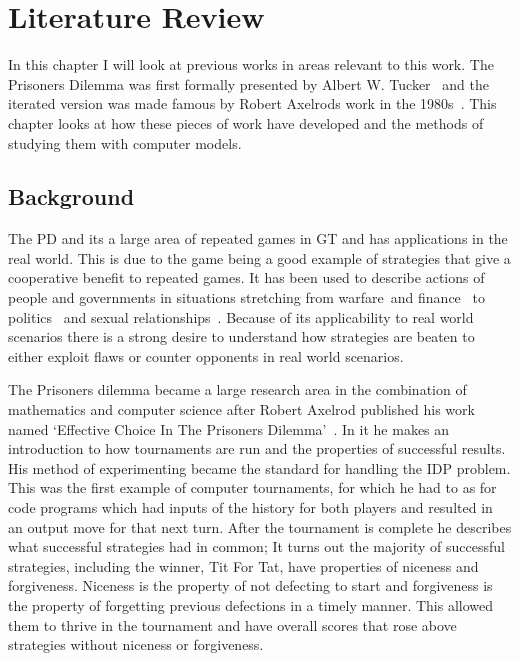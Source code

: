 
\chapter{Literature Review}\label{ch:literature}
In this chapter I will look at previous works in areas relevant to this work.
The Prisoners Dilemma was first formally presented by Albert W. Tucker~\cite{cambell2016thesis, gass2005annotated} and the iterated version was made famous by Robert Axelrods work in the 1980s~\cite{axelrod1980effective}.
This chapter looks at how these pieces of work have developed and the methods of studying them with computer models. 

\section{Background}\label{sec:background}
The PD and its a large area of repeated games in GT and has applications in the real world.
This is due to the game being a good example of strategies that give a cooperative benefit to repeated games.
It has been used to describe actions of people and governments in situations stretching from warfare~\cite{tooby1988war,aumann1992handbook}and finance~\cite{cable1997finance} to politics~\cite{snidal1985Politics} and sexual relationships~\cite{low2015sex}.
Because of its applicability to real world scenarios there is a strong desire to understand how strategies are beaten to either exploit flaws or counter opponents in real world scenarios.

The Prisoners dilemma became a large research area in the combination of mathematics and computer science after Robert Axelrod published his work named `Effective Choice In The Prisoners Dilemma'~\cite{axelrod1980effective}.
In it he makes an introduction to how tournaments are run and the properties of successful results.
His method of experimenting became the standard for handling the IDP problem.
This was the first example of computer tournaments, for which he had to as for code programs which had inputs of the history for both players and resulted in an output move for that next turn.
After the tournament is complete he describes what successful strategies had in common; 
It turns out the majority of successful strategies, including the winner, Tit For Tat, have properties of niceness and forgiveness.
Niceness is the property of not defecting to start and forgiveness is the property of forgetting previous defections in a timely manner.
This allowed them to thrive in the tournament and have overall scores that rose above strategies without niceness or forgiveness.

